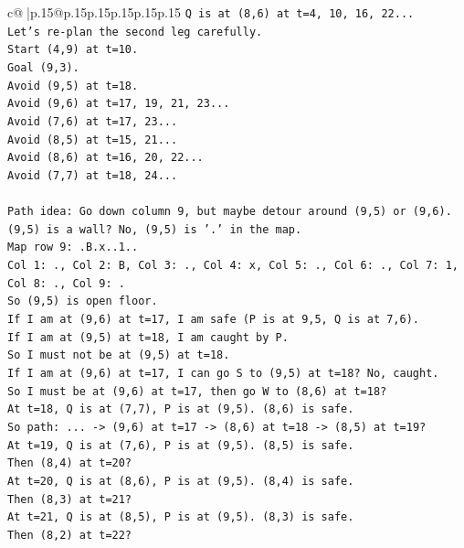 \documentclass{article}
\begin{document}
{\begin{supertabular}{c@{$\;$}|p{.15\linewidth}@{}p{.15\linewidth}p{.15\linewidth}p{.15\linewidth}p{.15\linewidth}p{.15\linewidth}}
{{{\texttt{Q is at (8,6) at t=4, 10, 16, 22...} \\
\texttt{Let's re{-}plan the second leg carefully.} \\
\texttt{Start (4,9) at t=10.} \\
\texttt{Goal (9,3).} \\
\texttt{Avoid (9,5) at t=18.} \\
\texttt{Avoid (9,6) at t=17, 19, 21, 23...} \\
\texttt{Avoid (7,6) at t=17, 23...} \\
\texttt{Avoid (8,5) at t=15, 21...} \\
\texttt{Avoid (8,6) at t=16, 20, 22...} \\
\texttt{Avoid (7,7) at t=18, 24...} \\
\\ 
\texttt{Path idea: Go down column 9, but maybe detour around (9,5) or (9,6).} \\
\texttt{(9,5) is a wall? No, (9,5) is '.' in the map.} \\
\texttt{Map row 9: .B.x..1..} \\
\texttt{Col 1: ., Col 2: B, Col 3: ., Col 4: x, Col 5: ., Col 6: ., Col 7: 1, Col 8: ., Col 9: .} \\
\texttt{So (9,5) is open floor.} \\
\texttt{If I am at (9,6) at t=17, I am safe (P is at 9,5, Q is at 7,6).} \\
\texttt{If I am at (9,5) at t=18, I am caught by P.} \\
\texttt{So I must not be at (9,5) at t=18.} \\
\texttt{If I am at (9,6) at t=17, I can go S to (9,5) at t=18? No, caught.} \\
\texttt{So I must be at (9,6) at t=17, then go W to (8,6) at t=18?} \\
\texttt{At t=18, Q is at (7,7), P is at (9,5). (8,6) is safe.} \\
\texttt{So path: ... {-}> (9,6) at t=17 {-}> (8,6) at t=18 {-}> (8,5) at t=19?} \\
\texttt{At t=19, Q is at (7,6), P is at (9,5). (8,5) is safe.} \\
\texttt{Then (8,4) at t=20?} \\
\texttt{At t=20, Q is at (8,6), P is at (9,5). (8,4) is safe.} \\
\texttt{Then (8,3) at t=21?} \\
\texttt{At t=21, Q is at (8,5), P is at (9,5). (8,3) is safe.} \\
\texttt{Then (8,2) at t=22?} \\
}}}
\end{supertabular}}
\end{document}
